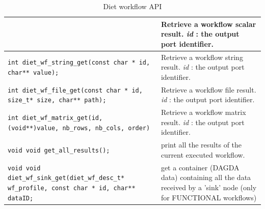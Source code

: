 \begin{table}[htbp]
\begin{tabular}[htbp]{|p{8cm}|p{7.5cm}|}
    &
    Retrieve a workflow scalar result. \newline
    \textit{id} : the output port identifier.
    \\\hline
    \texttt{int   \newline
      diet\_wf\_string\_get(const char * id, char** value);}
    &
    Retrieve a workflow string result. \newline
    \textit{id} : the output port identifier.
    \\\hline
    \texttt{int    \newline
      diet\_wf\_file\_get(const char * id, size\_t* size, char** path);
    }
    &
    Retrieve a workflow file result. \newline
    \textit{id} : the output port identifier.
    \\\hline
    \texttt{int \newline
      diet\_wf\_matrix\_get(id, (void**)value, nb\_rows, nb\_cols, order)
    }
    &
    Retrieve a workflow matrix result. \newline
    \textit{id} : the output port identifier.
    \\\hline
    \texttt{void \newline
      void get\_all\_results();}
    &
    print all the results of the current executed workflow.
    \\\hline
    \texttt{void \newline
      void diet\_wf\_sink\_get(diet\_wf\_desc\_t* wf\_profile, const char * id, char** dataID;}
    &
    get a container (DAGDA data) containing all the data received by a 'sink' node (only for
    FUNCTIONAL workflows)
    \\\hline
  \end{tabular}
  \caption{Diet workflow API}
  \label{tab::wf_api}
\end{table}


